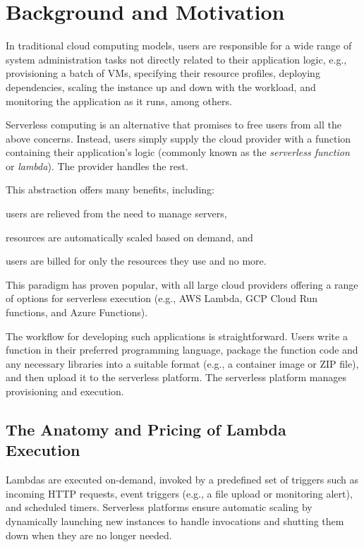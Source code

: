 \documentclass[sigplan,screen]{acmart}
\begin{document}
 
\section{Background and Motivation}\label{sec:measurement-study}






In traditional cloud computing models, users are responsible for a wide range of system administration tasks not directly related to their application logic, e.g., provisioning a batch of VMs, specifying their resource profiles, deploying dependencies, scaling the instance up and down with the workload, and monitoring the application as it runs, among others.

Serverless computing is an alternative that promises to free users from all the above concerns.
Instead, users simply supply the cloud provider with a function containing their application's logic (commonly known as the \textit{serverless function} or \textit{lambda}).
The provider handles the rest.



This abstraction offers many benefits, including: 
\begin{enumerate*}[label=(\arabic*)]
    \item users are relieved from the need to manage servers,
    \item resources are automatically scaled based on demand, and
    \item users are billed for only the resources they use and no more.
\end{enumerate*}
This paradigm has proven popular, with all large cloud providers offering a range of options for serverless execution (e.g., AWS Lambda, GCP Cloud Run functions, and Azure Functions).


The workflow for developing such applications is straightforward. 
Users write a function in their preferred programming language, package the function code and any necessary libraries into a suitable format (e.g., a container image or ZIP file), and then upload it to the serverless platform.
The serverless platform manages provisioning and execution.

\subsection{The Anatomy and Pricing of Lambda Execution} \label{ssec:anatomy}

Lambdas are executed on-demand, invoked by a predefined set of triggers such as incoming HTTP requests, event triggers (e.g., a file upload or monitoring alert), and scheduled timers.
Serverless platforms ensure automatic scaling by dynamically launching new instances to handle invocations and shutting them down when they are no longer needed.
\end{document}
